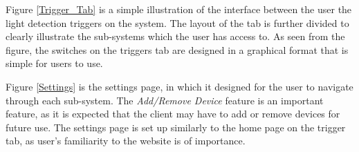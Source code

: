 \documentclass[11pt, a4paper]{article}
\begin{document}
	\noindent
	Figure \ref{Trigger_Tab} is a simple illustration of the interface between the user the light detection triggers on the system. The layout of the tab is further divided to clearly illustrate the sub-systems which the user has access to. As seen from the figure, the switches on the triggers tab are designed in a graphical format that is simple for users to use.  
	
	\noindent
	Figure \ref{Settings} is the settings page, in which it designed for the user to navigate through each sub-system. The \textit{Add/Remove Device} feature is an important feature, as it is expected that the client may have to add or remove devices for future use. The settings page is set up similarly to the home page on the trigger tab, as user's  familiarity to the website is of importance.
	
\end{document}
